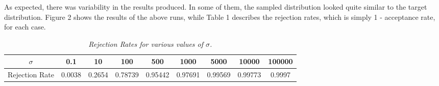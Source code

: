 \documentclass{article} %
\begin{document}
As expected, there was variability in the results produced. In some of them, the sampled distribution looked quite similar to the target distribution. Figure 2 shows the results of the above runs, while Table 1 describes the rejection rates, which is simply 1 - acceptance rate, for each case.

\begin{table}[h]
\centering
\caption{\label{tab:widgets} \textit{Rejection Rates for various values of \(\sigma\).}}
\begin{tabu}{|c|c|c|c|c|c|c|c|c|}
\hline
\rowfont{\bfseries} \(\sigma\) & 0.1 & 10 & 100 & 500 & 1000 & 5000 & 10000 & 100000 \\\hline
Rejection Rate & 0.0038 & 0.2654 & 0.78739 & 0.95442 & 0.97691 & 0.99569 & 0.99773 & 0.9997 \\\hline
\end{tabu}
\end{table}
\end{document}
